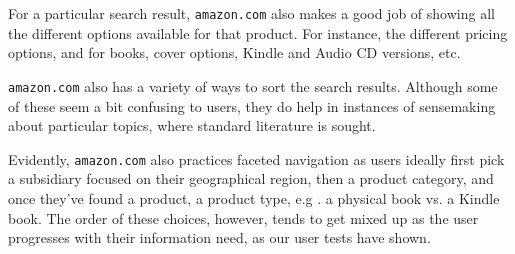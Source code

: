 \begin{enumerate}[a.]
For a particular search result, \texttt{amazon.com} also makes a good job of
showing all the different options available for that product. For instance, the
different pricing options, and for books, cover options, Kindle and Audio CD
versions, etc.

\texttt{amazon.com} also has a variety of ways to sort the search
results\cite[\textsection\ 8.3]{hearst}. Although some of these seem a bit
confusing to users, they do help in instances of sensemaking about particular
topics, where standard literature is sought.

Evidently, \texttt{amazon.com} also practices faceted navigation
\cite[\textsection\ 8.6]{hearst} as users ideally first pick a subsidiary
focused on their geographical region, then a product category, and once they've
found a product, a product type, e.g . a physical book vs. a Kindle book. The
order of these choices, however, tends to get mixed up as the user progresses
with their information need, as our user tests have shown.

\end{enumerate}

